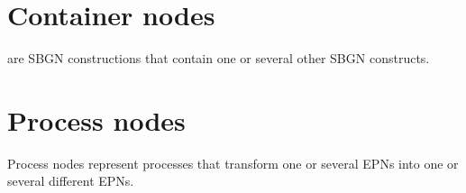 


















\section{Container nodes}\label{sec:CNs}

 are SBGN constructions that contain one or several other SBGN constructs.







\section{Process nodes}\label{sec:PNs}

Process nodes represent processes that transform one or several EPNs into one or several different EPNs.









